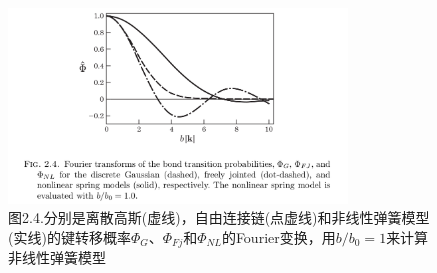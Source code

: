 \begin{figure}[ht]
\caption{图2.4.分别是离散高斯(虚线)，自由连接链(点虚线)和非线性弹簧模型(实线)的键转移概率$\varPhi_{G}$、$\varPhi_{Fj}$和$\varPhi_{NL}$的Fourier变换，用$b/b_{0}=1$来计算非线性弹簧模型}
\centering
\includegraphics[width=9cm]{./figures/24.png}
\end{figure}
%

